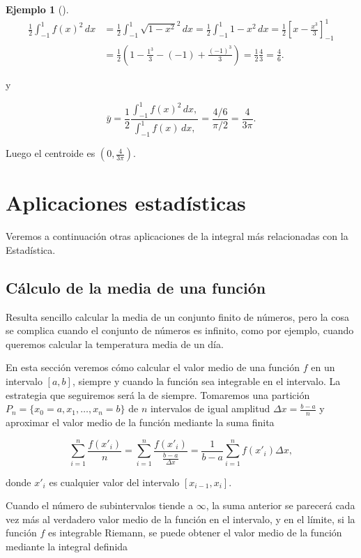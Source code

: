 \documentclass[
  a4paper,
]{scrreport}
\theoremstyle{definition}
\theoremstyle{definition}
\newtheorem{example}{Ejemplo}[chapter]
\theoremstyle{definition}
\theoremstyle{plain}
\theoremstyle{plain}
\theoremstyle{plain}
\theoremstyle{remark}
\begin{document}
\begin{example}[]
\begin{align*}
\frac{1}{2}\int_{-1}^1 f(x)^2\,dx 
&= \frac{1}{2}\int_{-1}^1 \sqrt{1-x^2}^2\,dx 
= \frac{1}{2}\int_{-1}^1 1-x^2\,dx
= \frac{1}{2}\left[x - \frac{x^3}{3}\right]_{-1}^1 \\
&= \frac{1}{2}\left(1-\frac{1^3}{3}-(-1)+\frac{(-1)^3}{3}\right)
= \frac{1}{2}\frac{4}{3}
= \frac{4}{6}. 
\end{align*}

y

\[
\bar y = \frac{1}{2}\frac{\int_{-1}^1 f(x)^2\, dx,}{\int_{-1}^1 f(x)\, dx,} = \frac{4/6}{\pi/2} = \frac{4}{3\pi}.
\]

Luego el centroide es \(\left(0, \frac{4}{3\pi}\right)\).

\end{example}

\section{Aplicaciones estadísticas}\label{aplicaciones-estaduxedsticas}

Veremos a continuación otras aplicaciones de la integral más
relacionadas con la Estadística.

\subsection{Cálculo de la media de una
función}\label{sec-valor-medio-integral}

Resulta sencillo calcular la media de un conjunto finito de números,
pero la cosa se complica cuando el conjunto de números es infinito, como
por ejemplo, cuando queremos calcular la temperatura media de un día.

En esta sección veremos cómo calcular el valor medio de una función
\(f\) en un intervalo \([a,b]\), siempre y cuando la función sea
integrable en el intervalo. La estrategia que seguiremos será la de
siempre. Tomaremos una partición \(P_n=\{x_0=a, x_1, \ldots, x_n=b\}\)
de \(n\) intervalos de igual amplitud \(\Delta x = \frac{b-a}{n}\) y
aproximar el valor medio de la función mediante la suma finita

\[
\sum_{i=1}^n \frac{f(x'_i)}{n} = \sum_{i=1}^n \frac{f(x'_i)}{\frac{b-a}{\Delta x}} = \frac{1}{b-a}\sum_{i=1}^n f(x'_i)\Delta x,
\]

donde \(x'_i\) es cualquier valor del intervalo \([x_{i-1},x_i]\).

Cuando el número de subintervalos tiende a \(\infty\), la suma anterior
se parecerá cada vez más al verdadero valor medio de la función en el
intervalo, y en el límite, si la función \(f\) es integrable Riemann, se
puede obtener el valor medio de la función mediante la integral definida
\end{document}
